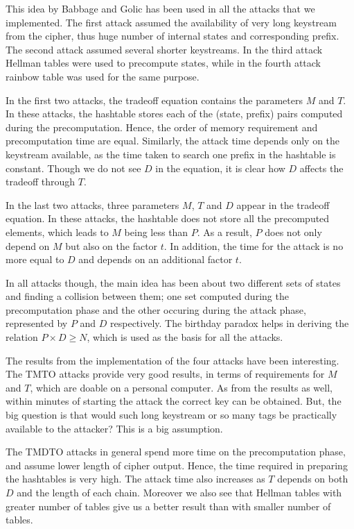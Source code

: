 This idea by Babbage and Golic has been used in all the attacks that we implemented. The first attack assumed the availability of very long keystream from the cipher, thus huge number of internal states and corresponding prefix. The second attack assumed several shorter keystreams. In the third attack Hellman tables were used to precompute states, while in the fourth attack rainbow table was used for the same purpose. 

In the first two attacks, the tradeoff equation contains the parameters $M$ and $T$. In these attacks, the hashtable stores each of the (state, prefix) pairs computed during the precomputation. Hence, the order of memory requirement and precomputation time are equal. Similarly, the attack time depends only on the keystream available, as the time taken to search one prefix in the hashtable is constant. Though we do not see $D$ in the equation, it is clear how $D$ affects the tradeoff through $T$.

In the last two attacks, three parameters $M$, $T$ and $D$ appear in the tradeoff equation. In these attacks, the hashtable does not store all the precomputed elements, which leads to $M$ being less than $P$. As a result, $P$ does not only depend on $M$ but also on the factor $t$. In addition, the time for the attack is no more equal to $D$ and depends on an additional factor $t$. 

In all attacks though, the main idea has been about two different sets of states and finding a collision between them; one set computed during the precomputation phase and the other occuring during the attack phase, represented by $P$ and $D$ respectively. The birthday paradox helps in deriving the relation $P \times D \geq N$, which is used as the basis for all the attacks. 

The results from the implementation of the four attacks have been interesting. The TMTO attacks provide very good results, in terms of requirements for $M$ and $T$, which are doable on a personal computer. As from the results as well, within minutes of starting the attack the correct key can be obtained. But, the big question is that would such long keystream or so many tags be practically available to the attacker? This is a big assumption.

The TMDTO attacks in general spend more time on the precomputation phase, and assume lower length of cipher output. Hence, the time required in preparing the hashtables is very high. The attack time also increases as $T$ depends on both $D$ and the length of each chain. Moreover we also see that Hellman tables with greater number of tables give us a better result than with smaller number of tables. 

